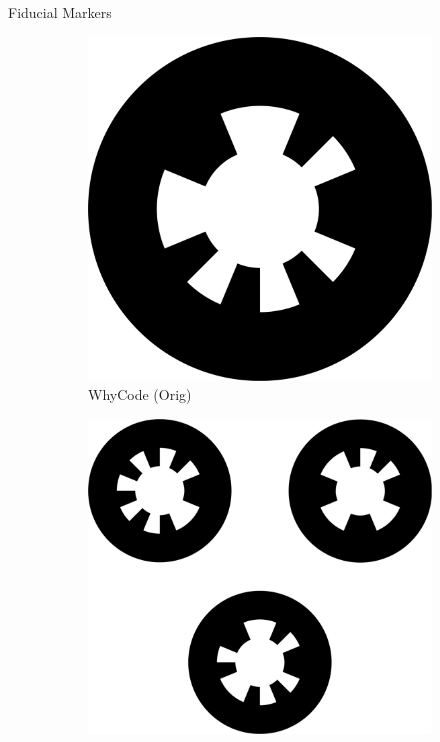 \documentclass[aspectratio=169]{beamer}
\begin{document}
\begin{frame}{Fiducial Markers}
\begin{figure}[]
		\hspace{0.01\linewidth}
	    \begin{subfigure}[b]{0.23\linewidth}
		\includegraphics[width=\textwidth]{./images/whycode_20_8}
		    \caption{WhyCode (Orig)\cite{whycode_paper}}
		\label{figure:whycode_single}
	    \end{subfigure}
		\hspace{0.01\linewidth}
	    \begin{subfigure}[b]{0.23\linewidth}
		\includegraphics[width=\textwidth]{./images/whycode_multi}

\end{subfigure}
\end{figure}
\end{frame}
\end{document}
